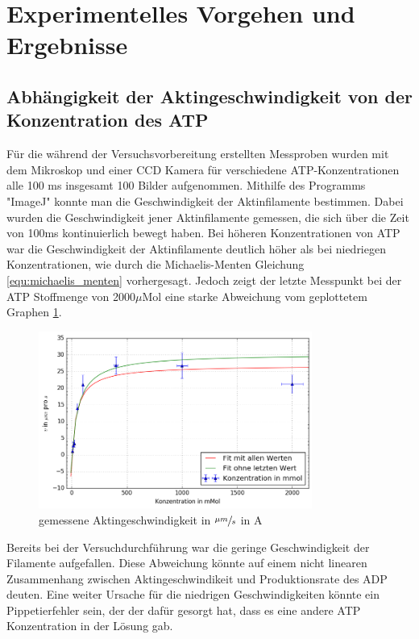 \section{Experimentelles Vorgehen und Ergebnisse}
\subsection{Abhängigkeit der Aktingeschwindigkeit von der Konzentration des ATP}
Für die während der Versuchsvorbereitung erstellten Messproben wurden mit dem Mikroskop und einer CCD Kamera für verschiedene ATP-Konzentrationen alle
100 ms insgesamt 100 Bilder aufgenommen. Mithilfe des Programms "ImageJ" konnte man die Geschwindigkeit
der Aktinfilamente bestimmen. Dabei wurden die Geschwindigkeit jener Aktinfilamente gemessen, die
sich über die Zeit von 100ms kontinuierlich bewegt haben. Bei höheren Konzentrationen von ATP war die
Geschwindigkeit der Aktinfilamente deutlich höher als bei niedriegen Konzentrationen,
wie durch die Michaelis-Menten Gleichung \ref{equ:michaelis_menten} vorhergesagt.
Jedoch zeigt der letzte Messpunkt bei der ATP Stoffmenge von 2000$\mu \text{Mol}$ eine starke
Abweichung vom geplottetem Graphen \ref{fig:normal_speed}.
\begin{figure}[h]
  \centering
  \includegraphics[width=0.8\textwidth]{bilder/both_fits.png}
  \caption{gemessene Aktingeschwindigkeit in $\sfrac{\mu m}{s}$ in A}
  \label{fig:normal_speed}
\end{figure}
Bereits bei der Versuchdurchführung war die geringe Geschwindigkeit der Filamente aufgefallen.
Diese Abweichung könnte auf einem nicht linearen Zusammenhang zwischen
Aktingeschwindikeit und Produktionsrate des ADP deuten.
Eine weiter Ursache für die niedrigen Geschwindigkeiten könnte ein Pippetierfehler sein,
der der dafür gesorgt hat, dass es eine andere ATP Konzentration in der Lösung gab.\newline 
